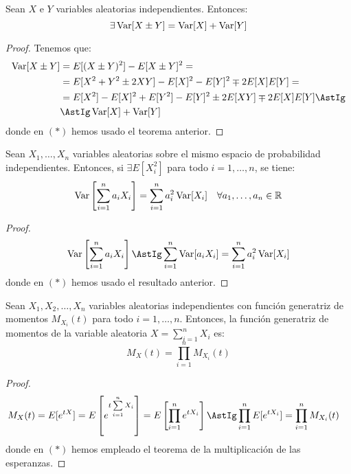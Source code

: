 \begin{coro}
    Sean $X$ e $Y$ variables aleatorias independientes. Entonces:
    \begin{equation*}
        \exists  \operatorname{Var}[X\pm Y] = \operatorname{Var}[X] + \operatorname{Var}[Y]
    \end{equation*}
\end{coro}
\begin{proof}
    Tenemos que:
    \begin{align*}
        \Var[X \pm Y] &= E[(X\pm Y)^2] - E[X\pm Y]^2
        =\\&= E[X^2 + Y^2 \pm 2XY] - E[X]^2 - E[Y]^2 \mp 2E[X]E[Y]
        =\\&= E[X^2] - E[X]^2 + E[Y^2] -E[Y]^2 \pm 2E[XY] \mp 2E[X]E[Y]
        \AstIg\\&\AstIg \Var[X] + \Var[Y]
    \end{align*}
    donde en $(\ast)$ hemos usado el teorema anterior.
\end{proof}

\begin{coro}
    Sean $X_1, \ldots, X_n$ variables aleatorias sobre el mismo espacio de probabilidad independientes. Entonces, si $\exists E[X_i^2]$ para todo $i = 1, \ldots, n$, se tiene:
    \[
        \operatorname{Var}\left[\sum_{i=1}^n a_i X_i\right] = \sum_{i=1}^n a_i^2\operatorname{Var}[X_i] \quad \forall a_1, \ldots, a_n \in \mathbb{R}
    \]
\end{coro}
\begin{proof}
    \begin{equation*}
        \Var\left[\sum_{i=1}^n a_iX_i\right]
        \AstIg \sum_{i=1}^n \Var[a_iX_i]
        = \sum_{i=1}^n a_i^2 \Var[X_i]
    \end{equation*}
    donde en $(\ast)$ hemos usado el resultado anterior.
\end{proof}


\begin{coro}\label{coro:generatriz_momentos_independientes}
    Sean $X_1,X_2,\ldots,X_n$ variables aleatorias independientes con función generatriz de momentos $M_{X_i}(t)$ para todo $i=1,\dots,n$. Entonces, la función generatriz de momentos de la variable aleatoria $X=\sum\limits_{i=1}^n X_i$ es:
    \begin{equation*}
        M_X(t)=\prod_{i=1}^n M_{X_i}(t)
    \end{equation*}
\end{coro}
\begin{proof}
    \begin{equation*}\begin{split}
        M_X(t)
        &= E[e^{tX}]
        = E\left[e^{t\sum\limits_{i=1}^n X_i}\right]
        = E\left[\prod_{i=1}^n e^{tX_i}\right]
        \AstIg \prod_{i=1}^n E[e^{tX_i}]
        = \prod_{i=1}^n M_{X_i}(t)
    \end{split}\end{equation*}
    donde en $(\ast)$ hemos empleado el teorema de la multiplicación de las esperanzas.
\end{proof}


